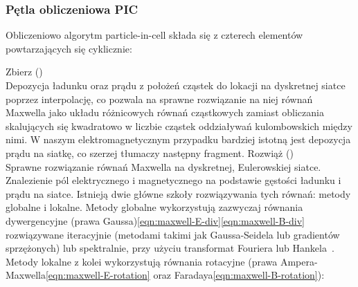     \subsubsection{Pętla obliczeniowa PIC}
    Obliczeniowo algorytm particle-in-cell składa się z czterech elementów
    powtarzających się cyklicznie:
    \begin{itemize}
        \itemi{} Zbierz ()\\
    Depozycja ładunku oraz prądu z położeń cząstek do lokacji na dyskretnej
    siatce poprzez interpolację, co pozwala na sprawne rozwiązanie na niej
    równań Maxwella jako układu różnicowych równań cząstkowych zamiast
    obliczania skalujących się kwadratowo w liczbie cząstek oddziaływań
    kulombowskich między nimi.  W naszym elektromagnetycznym przypadku bardziej
    istotną jest depozycja prądu na siatkę, co szerzej tłumaczy następny
    fragment.
    \itemi{} Rozwiąż ()\\
    Sprawne rozwiązanie równań Maxwella na dyskretnej, Eulerowskiej siatce.
    Znalezienie pól elektrycznego i magnetycznego na podstawie gęstości ładunku
    i prądu na siatce.  Istnieją dwie główne szkoły rozwiązywania tych równań:
    metody globalne i lokalne. Metody globalne wykorzystują zazwyczaj równania
    dywergencyjne (prawa Gaussa)\ref{eqn:maxwell-E-div}\ref{eqn:maxwell-B-div}
    rozwiązywane iteracyjnie (metodami takimi jak Gaussa-Seidela lub gradientów
    sprzężonych)
     lub spektralnie, przy użyciu transformat Fouriera lub Hankela~\cite{fbpic}.
     Metody lokalne z kolei
    wykorzystują równania rotacyjne (prawa Ampera-Maxwella\ref{eqn:maxwell-E-rotation}
    oraz Faradaya\ref{eqn:maxwell-B-rotation}):


\end{itemize}
